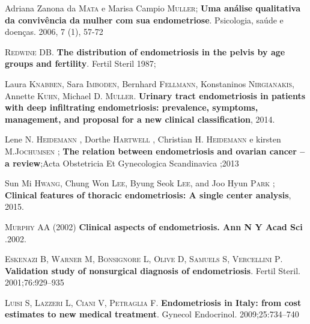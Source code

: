 \documentclass[12pt]{article} %
\begin{document}
\vspace{0,5cm}

Adriana Zanona da \textsc{Mata} e Marisa Campio \textsc{Muller};\textbf{ Uma análise qualitativa da convivência da mulher com sua endometriose}. Psicologia, saúde e doenças. 2006, 7 (1), 57-72

\vspace{0,5cm}

\textsc{Redwine DB}.\textbf{ The distribution of endometriosis in the pelvis by age groups and fertility}. Fertil Steril 1987; 

\vspace{0,5cm}

Laura \textsc{Knabben}, Sara \textsc{Imboden}, Bernhard \textsc{Fellmann}, Konstaninos \textsc{Nirgianakis}, Annette \textsc{Kuhn}, Michael D.\textsc{ Muller}. \textbf{Urinary tract endometriosis in patients with deep infiltrating endometriosis: prevalence, symptoms, management, and proposal for a new clinical classification}, 2014.

\vspace{0,5cm}

Lene N. \textsc{Heidemann} , Dorthe \textsc{Hartwell} , Christian H. \textsc{Heidemann} e kirsten M.\textsc{Jochumsen} ; \textbf{The relation between endometriosis and ovarian cancer – a review};Acta Obstetricia Et Gynecologica Scandinavica ;2013

\vspace{0,5cm}

Sun Mi\textsc{ Hwang}, Chung Won \textsc{Lee}, Byung Seok\textsc{ Lee}, and Joo Hyun \textsc{Park} ;\textbf{ Clinical features of thoracic endometriosis: A single center analysis}, 2015.

\vspace{0,5cm}

\textsc{Murphy AA} (2002) \textbf{Clinical aspects of endometriosis. Ann N Y Acad Sci} .2002.

\vspace{0,5cm}

\textsc{Eskenazi B, Warner M, Bonsignore L, Olive D, Samuels S, Vercellini P}. \textbf{Validation study of nonsurgical diagnosis of endometriosis}. Fertil Steril. 2001;76:929–935

\vspace{0,5cm}

\textsc{Luisi S, Lazzeri L, Ciani V, Petraglia F}.\textbf{ Endometriosis in Italy: from cost estimates to new medical treatment}. Gynecol Endocrinol. 2009;25:734–740
\end{document}

